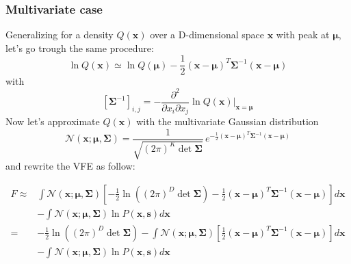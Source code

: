 \documentclass[a4paper, 10pt]{article}
\begin{document}
\subsubsection*{Multivariate case}
Generalizing for a density $Q(\mathbf x)$ over a D-dimensional space $\mathbf x$ with peak at $\boldsymbol \mu$, let's go trough the same procedure:
\begin{equation}
\ln Q(\mathbf x) \simeq \ln Q(\boldsymbol{\mu}) - \frac{1}{2} (\mathbf x-\boldsymbol \mu)^T \boldsymbol \Sigma^{-1} (\mathbf x-\boldsymbol \mu)
\end{equation}
with
\begin{equation}
\left[ \boldsymbol \Sigma^{-1}\right]_{i,j} = - \frac{\partial^{2} }{\partial x_i \partial x_j} \ln Q(\mathbf x) \bigg\rvert_{\mathbf x=\boldsymbol \mu} 
\end{equation}
Now let's approximate $Q(\mathbf x)$ with the multivariate Gaussian distribution
\begin{equation}
\mathcal{N}(\mathbf x;\boldsymbol \mu, \boldsymbol \Sigma) = \frac{1}{\sqrt{( 2 \pi)^{K} \det \boldsymbol \Sigma}} \, e^{ - \frac{1}{2} (\mathbf x-\boldsymbol \mu)^T \boldsymbol \Sigma^{-1} (\mathbf x-\boldsymbol \mu)}
\end{equation}
and rewrite the VFE as follow:

\begin{equation}
\label{eqn:f1}
\begin{split}
F \approx & \int \mathcal{N}(\mathbf x; \bm \mu, \bm \Sigma) \left[ -\frac{1}{2} \ln \left( (2 \pi)^{D} \det \bm \Sigma \right) - \frac{1}{2} (\mathbf x-\boldsymbol \mu)^T \boldsymbol \Sigma^{-1} (\mathbf x-\boldsymbol \mu) \right] d \mathbf x \\
	& - \int \mathcal{N}(\mathbf x;\bm \mu,\bm \Sigma) \ln P(\mathbf x,\mathbf s) d \mathbf x \\
    = & -\frac{1}{2} \ln \left( (2 \pi)^{D} \det \bm \Sigma \right) - \int \mathcal{N}(\mathbf x; \bm \mu, \bm \Sigma) \left[ \frac{1}{2} (\mathbf x-\boldsymbol \mu)^T \boldsymbol \Sigma^{-1} (\mathbf x-\boldsymbol \mu) \right] d \mathbf x \\
    & - \int \mathcal{N}(\mathbf x;\bm \mu,\bm \Sigma) \ln P(\mathbf x,\mathbf s) d \mathbf x 
\end{split}
\end{equation}
\end{document}
